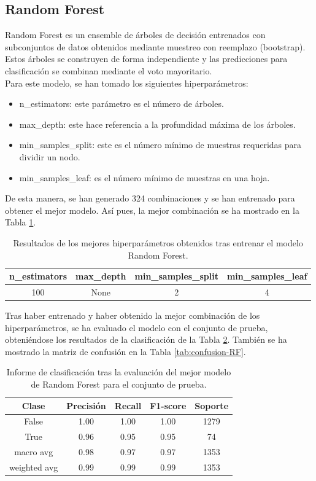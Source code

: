 \documentclass[12pt,letterpaper]{article}
\begin{document}
\subsection{Random Forest}
Random Forest es un ensemble de árboles de decisión entrenados con subconjuntos de datos obtenidos mediante muestreo con reemplazo (bootstrap).\\
Estos árboles se construyen de forma independiente y las predicciones para clasificación se combinan mediante el voto mayoritario.\\
Para este modelo, se han tomado los siguientes hiperparámetros:
\begin{itemize}
    \item n\_estimators: este parámetro es el número de árboles.
    \item max\_depth: este hace referencia a la profundidad máxima de los árboles.
    \item min\_samples\_split: este es el número mínimo de muestras requeridas para dividir un nodo.
    \item min\_samples\_leaf: es el número mínimo de muestras en una hoja.
\end{itemize}

De esta manera, se han generado 324 combinaciones y se han entrenado para obtener el mejor modelo. Así pues, la mejor combinación se ha mostrado en la Tabla \ref{tab:hiper_RF}.
\begin{table}[H]
    \centering
    \begin{tabular}{|c|c|c|c|}
    \hline
    n\_estimators &  max\_depth & min\_samples\_split & min\_samples\_leaf \\ \hline
    100 & None & 2 & 4 \\ \hline
    \end{tabular}
    \caption{Resultados de los mejores hiperparámetros obtenidos tras entrenar el modelo Random Forest.}
    \label{tab:hiper_RF}
\end{table}

Tras haber entrenado y haber obtenido la mejor combinación de los hiperparámetros, se ha evaluado el modelo con el conjunto de prueba, obteniéndose los resultados de la clasificación de la Tabla \ref{tab:res-RF}. También se ha mostrado la matriz de confusión en la Tabla \ref{tab:confusion-RF}.
\begin{table}[H]
    \centering
    \begin{tabular}{|c|c|c|c|c|}
    \hline
    Clase & Precisión & Recall & F1-score & Soporte \\ \hline\hline
    False & 1.00 & 1.00 & 1.00 & 1279 \\ \hline
    True & 0.96 & 0.95 & 0.95 & 74 \\ \hline
    macro avg & 0.98 & 0.97 & 0.97 & 1353 \\ \hline
    weighted avg & 0.99 & 0.99 & 0.99 & 1353 \\ \hline
    \end{tabular}
    \caption{Informe de clasificación tras la evaluación del mejor modelo de Random Forest para el conjunto de prueba.}
    \label{tab:res-RF}
\end{table}
\end{document}
